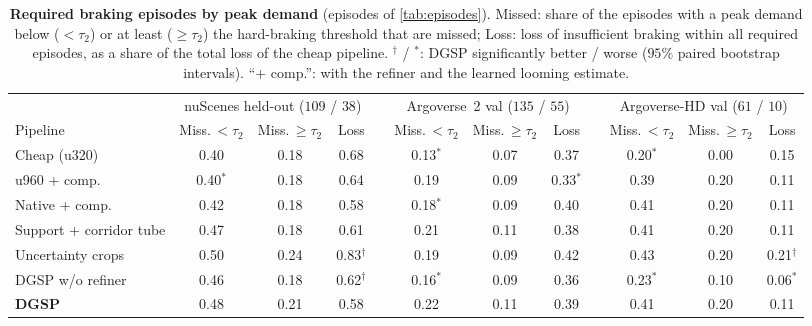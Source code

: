 \documentclass[10pt,letterpaper]{article}
\newcommand{\method}{DGSP\xspace}
\newcommand{\oursrow}{\rowcolor{oursbg}}
\theoremstyle{remark}
\theoremstyle{plain}
\theoremstyle{definition}
\begin{document}
\begin{table}[!tbp]
\centering
\caption{\textbf{Required braking episodes by peak demand} (episodes of \cref{tab:episodes}). Missed: share of the episodes with a peak demand below ($<\tau_2$) or at least ($\geq\tau_2$) the hard-braking threshold that are missed; Loss: loss of insufficient braking within all required episodes, as a share of the total loss of the cheap pipeline. $^{\dagger}$ / $^{\ast}$: \method significantly better / worse ($95\%$ paired bootstrap intervals). ``+ comp.'': with the refiner and the learned looming estimate.}
\label{tab:severity}
\footnotesize
\setlength{\tabcolsep}{3.6pt}
\begin{tabular}{@{}lccccccccccc@{}}
\toprule
 & \multicolumn{3}{c}{nuScenes held-out ($109$ / $38$)} & & \multicolumn{3}{c}{Argoverse~2 val ($135$ / $55$)} & & \multicolumn{3}{c}{Argoverse-HD val ($61$ / $10$)} \\
\cmidrule(lr){2-4}\cmidrule(lr){6-8}\cmidrule(l){10-12}
Pipeline & Miss.\,$<\tau_2$ & Miss.\,$\geq\tau_2$ & Loss & & Miss.\,$<\tau_2$ & Miss.\,$\geq\tau_2$ & Loss & & Miss.\,$<\tau_2$ & Miss.\,$\geq\tau_2$ & Loss \\
\midrule
Cheap (u320) & 0.40 & 0.18 & 0.68 & & 0.13$^{\ast}$ & 0.07 & 0.37 & & 0.20$^{\ast}$ & 0.00 & 0.15 \\
u960 + comp. & 0.40$^{\ast}$ & 0.18 & 0.64 & & 0.19 & 0.09 & 0.33$^{\ast}$ & & 0.39 & 0.20 & 0.11 \\
Native + comp. & 0.42 & 0.18 & 0.58 & & 0.18$^{\ast}$ & 0.09 & 0.40 & & 0.41 & 0.20 & 0.11 \\
Support + corridor tube & 0.47 & 0.18 & 0.61 & & 0.21 & 0.11 & 0.38 & & 0.41 & 0.20 & 0.11 \\
Uncertainty crops & 0.50 & 0.24 & 0.83$^{\dagger}$ & & 0.19 & 0.09 & 0.42 & & 0.43 & 0.20 & 0.21$^{\dagger}$ \\
\method w/o refiner & 0.46 & 0.18 & 0.62$^{\dagger}$ & & 0.16$^{\ast}$ & 0.09 & 0.36 & & 0.23$^{\ast}$ & 0.10 & 0.06$^{\ast}$ \\
\midrule
\oursrow \textbf{\method} & 0.48 & 0.21 & 0.58 & & 0.22 & 0.11 & 0.39 & & 0.41 & 0.20 & 0.11 \\
\bottomrule
\end{tabular}
\end{table}
\end{document}
